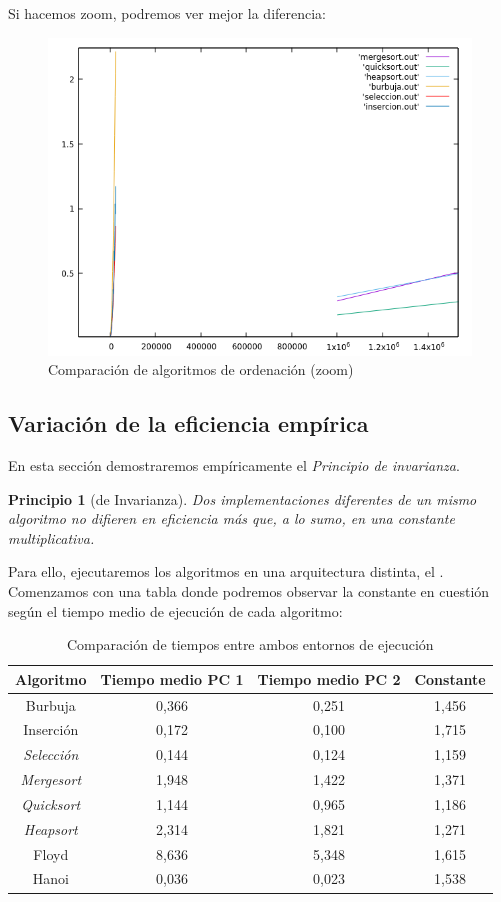\documentclass[12pt,spanish]{article}
\newtheorem{ppio}{Principio }
\begin{document}
Si hacemos zoom, podremos ver mejor la diferencia:

\begin{figure}[H]
\centering
\includegraphics[scale=0.75]{empirica_ordenacion_comparacion_zoom.png}
\caption{Comparación de algoritmos de ordenación (zoom)}
\end{figure}
\subsection{Variación de la eficiencia empírica}
\label{sec:variacion}
En esta sección demostraremos empíricamente el \emph{Principio de invarianza}.
\begin{ppio}[de Invarianza]
Dos implementaciones diferentes de un  mismo  algoritmo  no  difieren  en  eficiencia  más  que,  a  lo  sumo,  en  una constante multiplicativa.
\end{ppio}
Para ello, ejecutaremos los algoritmos en una arquitectura distinta, el \textit{}.
Comenzamos con una tabla donde podremos observar la constante en cuestión según el tiempo medio de ejecución de cada algoritmo:
\begin{table}[H]
\centering
\begin{tabular}{|c|c|c|c|}
\hline
\textbf{Algoritmo} & \textbf{Tiempo medio PC 1} & \textbf{Tiempo medio PC 2} & \textbf{Constante} \\
\hline
Burbuja & 0,366 & 0,251 & 1,456\\
\hline
Inserción & 0,172 & 0,100 & 1,715\\
\hline
\textit{Selección} & 0,144 & 0,124 & 1,159\\
\hline
\textit{Mergesort} & 1,948 & 1,422 & 1,371\\
\hline
\textit{Quicksort} & 1,144 & 0,965 & 1,186\\
\hline
\textit{Heapsort} & 2,314 & 1,821 & 1,271\\
\hline
Floyd & 8,636 & 5,348 & 1,615\\
\hline
Hanoi & 0,036 & 0,023 & 1,538\\
\hline
\end{tabular}
\caption{Comparación de tiempos entre ambos entornos de ejecución}
\end{table}
\end{document}
